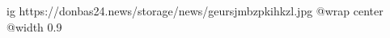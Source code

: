  
 
 
 
 

\ifcmt
  ig https://donbas24.news/storage/news/geursjmbzpkihkzl.jpg
  @wrap center
  @width 0.9
\fi
